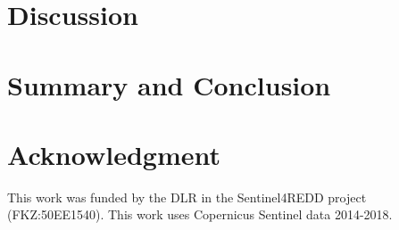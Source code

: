 \documentclass[journal]{IEEEtran}
\begin{document}
 
\section{Discussion}
 
 
\section{Summary and Conclusion}



\section*{Acknowledgment}
This work was funded by the DLR in the Sentinel4REDD project (FKZ:50EE1540). 
This work uses Copernicus Sentinel data 2014-2018.

\ifCLASSOPTIONcaptionsoff
  \newpage
\fi
 

 
\end{document}
